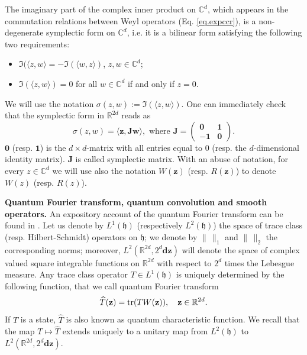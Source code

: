 \documentclass[preprint]{elsarticle}
\theoremstyle{definition}
\def\hh{\mathfrak{h} }
\def\CC{\mathbb{C}}
\def\RR{\mathbb{R}}
\def\hh{\mathfrak{h}}
\def\tr{{\rm tr}}
\begin{document}
The imaginary part of the complex inner product on $\CC^d$, which appears in the commutation relations between Weyl operators (Eq. \eqref{eq.expccr}), is a non-degenerate symplectic form on $\CC^d$, i.e. it is a bilinear form satisfying the following two requirements:
\begin{itemize}
\item $\Im(\langle z,w\rangle=-\Im(\langle w,z\rangle)$, $z,w \in \CC^d$;
\item $\Im(\langle z,w\rangle )=0$ for all $w \in \CC^d$ if and only if $z=0$.
\end{itemize}
We will use the notation $\sigma(z,w):=\Im(\langle z,w \rangle)$. One can immediately check that the symplectic form in $\RR^{2d}$ reads as
$$\sigma(z,w)=\langle \mathbf{z}, \mathbf{J} \mathbf{w}\rangle, \text{ where } \mathbf{J}=\begin{pmatrix} \mathbf{0} & \mathbf{1} \\
-\mathbf{1} & \mathbf{0} \end{pmatrix}.$$
$\mathbf{0}$ (resp. $\mathbf{1}$) is the $d\times d$-matrix with all entries equal to $0$ (resp. the $d$-dimensional identity matrix). $\mathbf{J}$ is called symplectic matrix. With an abuse of notation, for every $z \in \CC^d$ we will use also the notation $W(\mathbf{z})$ (resp. $R(\mathbf{z})$) to denote $W(z)$ (resp. $R(z)$).

\bigskip \textbf{Quantum Fourier transform, quantum convolution and smooth operators.} An expository account of the quantum Fourier transform can be found in \cite[Section 5.4]{Ho82}. Let us denote by $L^1(\hh)$ (respectively $L^2(\hh)$) the space of trace class (resp. Hilbert-Schmidt) operators on $\hh$; we denote by $\| \, \|_1$ and $\| \, \|_2$ the corresponding norms; moreover, $L^2(\RR^{2d},2^{d}\mathbf{dz})$ will denote the space of complex valued square integrable functions on $\RR^{2d}$ with respect to $2^{d}$ times the Lebesgue measure. Any trace class operator $T \in L^1(\hh)$ is uniquely determined by the following function, that we call quantum Fourier transform 
$$\widehat{T}(\mathbf{z})=\tr(TW(\mathbf{z})), \quad \mathbf{z} \in \RR^{2d}.$$
If $T$ is a state, $\widehat{T}$ is also known as quantum characteristic function. We recall that the map $T \mapsto \widehat{T}$ extends uniquely to a unitary map from $L^2(\hh)$ to $L^2(\RR^{2d},2^{d}\mathbf{dz}).$
\end{document}
